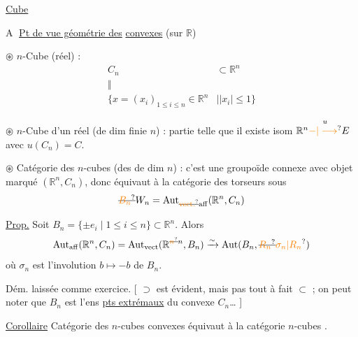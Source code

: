 \uline{Cube}

\textcircled{A} \uline{Pt de vue géométrie des}  \uline{convexes} (sur $\mathbb R$)

$\circledast$ $n$-Cube  (réel) :
\[
\begin{aligned}
 C_n&\subset\mathbb R^n\\[-2pt]
 \Vert\quad&\\[-4pt]
 \{x=(x_i)_{1\leq i\leq n}\in\mathbb R^n&\mid |x_i|\leq1\}
\end{aligned}
\]

$\circledast$ $n$-Cube  d'un   réel  (de dim finie $n$) : partie
telle que il existe isom  $\mathbb R^n\overset{u}{\unsure{-|\longrightarrow}}E$ avec $u(C_n)=C$.

$\circledast$ Catégorie des $n$-cubes   (des   de dim $n$) :
 c'est une groupoïde connexe avec objet
marqué  $(\mathbb R^n,C_n)$, donc équivaut à la
catégorie des torseurs sous
\[
 \deleted{\unsure{B_n}} W_n=\mathrm{Aut}_{\deleted{\unsure{\mathrm{vect}.}}\mathrm{aff}}(\mathbb R^n,C_n)
\]

\uline{Prop.} Soit $B_n=\{\pm e_i\mid 1\leq i\leq n\}\subset\mathbb R^n$. Alors
\[
 \mathrm{Aut}_{\mathrm{aff}}(\mathbb R^n,C_n)=\mathrm{Aut}_{\mathrm{vect}}(\mathbb R^{\deleted{\unsure{n}}n},B_n)
 \xrightarrow{\sim}\mathrm{Aut}(B_n,\deleted{\unsure{R_n}}\unsure{\sigma_n|R_n})
\]
où $\sigma_n$ est l'involution $b\mapsto-b$ de $B_n$.

 Dém. laissée comme exercice. [ $\supset$ est
évident, mais pas tout à fait $\subset$ ; on peut noter
que $B_n$ est l'ens  \uline{pts extrémaux} du
convexe $C_n$\ldots{} ]

\uline{Corollaire} Catégorie des $n$-cubes convexes équivaut
à  la catégorie   $n$-cubes .


